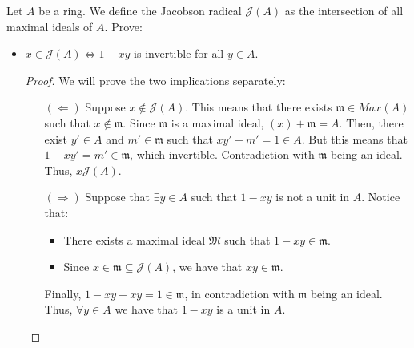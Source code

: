 \begin{problem}
    Let $A$ be a ring.
    We define the Jacobson radical $\mathcal{J}(A)$ as the intersection of all maximal ideals of $A$.
    Prove:
    \begin{itemize}

        \item \label{itm:jacobson_element_to_invertible} $x \in \mathcal{J}(A) \Leftrightarrow 1-xy$ is invertible for all $y \in A$.
            \begin{sol}
                \begin{proof}
                We will prove the two implications separately:
                    \begin{itemize}
                        \item[$(\Leftarrow)$]
                        Suppose $x \notin \mathcal{J}(A)$.
                        This means that there exists $\mathfrak{m} \in Max(A)$ such that $x \notin \mathfrak{m}$.
                        Since $\mathfrak{m}$ is a maximal ideal, $(x) + \mathfrak{m} = A$.
                        Then, there exist $y' \in A$ and $m' \in \mathfrak{m}$ such that $x y' + m' = 1 \in A$.
                        But this means that $1 - x y' = m' \in \mathfrak{m}$, which invertible.
                        Contradiction with $\mathfrak{m}$ being an ideal.
                        Thus, $x \mathcal{J}(A)$.
                        \item[$(\Rightarrow)$]
                        Suppose that $\exists y \in A$ such that $1-x y$ is not a unit in $A$.
                        Notice that:
                        \begin{itemize}
                            \item There exists a maximal ideal $\mathfrak{M}$ such that $1 - x y \in \mathfrak{m}$.
                            \item Since $x \in \mathfrak{m} \subseteq \mathcal{J}(A)$, we have that $x y \in \mathfrak{m}$.
                        \end{itemize}
                        Finally,  $1 - x y + x y = 1 \in \mathfrak{m}$, in contradiction with $\mathfrak{m}$ being an ideal.
                        Thus, $\forall y \in A$ we have that $1 - x y$ is a unit in $A$.
                    \end{itemize}
                \end{proof}
            \end{sol}


\end{itemize}
\end{problem}
